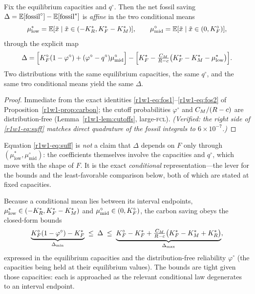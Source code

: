 \begin{theorem}\label{r1w1-thm:suffstat}
Fix the equilibrium capacities and $q^{\circ}$. Then the net fossil saving
$\Delta=\mathbb{E}[\text{fossil}^{\circ}]-\mathbb{E}[\text{fossil}^{*}]$ is \emph{affine} in the
two conditional means
\[
  \mu^{*}_{\mathrm{low}}=\mathbb{E}[\tilde x\mid \tilde x\in(-K_R^{*},K_F^{*}-K_M^{*})],
  \qquad
  \mu^{\circ}_{\mathrm{mid}}=\mathbb{E}[\tilde x\mid \tilde x\in(0,K_F^{\circ})],
\]
through the explicit map
\begin{equation}\label{r1w1-eq:suff}
  \Delta
  =\Big[K_F^{\circ}(1-\varphi^{\circ})+(\varphi^{\circ}-q^{\circ})\mu^{\circ}_{\mathrm{mid}}\Big]
   -\Big[K_F^{*}-\tfrac{C_M}{R-c}\big(K_F^{*}-K_M^{*}-\mu^{*}_{\mathrm{low}}\big)\Big].
\end{equation}
Two distributions with the same equilibrium capacities, the same $q^{\circ}$, and
the same two conditional means yield the same $\Delta$.
\end{theorem}

\begin{proof}
Immediate from the exact identities \eqref{r1w1-eq:fos1}--\eqref{r1w1-eq:fos2} of
Proposition~\ref{r1w1-prop:carbon}; the cutoff probabilities $\varphi^{\circ}$ and
$C_M/(R-c)$ are distribution-free (Lemma~\ref{r1w1-lem:cutoffs}, large-\textsc{fcl}).
\emph{(Verified: the right side of \eqref{r1w1-eq:suff} matches direct quadrature of the
fossil integrals to $6\times10^{-7}$.)}
\end{proof}

\begin{remark}
Equation \eqref{r1w1-eq:suff} is \emph{not} a claim that $\Delta$ depends on $F$ only
through $(\mu^{*}_{\mathrm{low}},\mu^{\circ}_{\mathrm{mid}})$: the coefficients
themselves involve the capacities and $q^{\circ}$, which move with the shape of
$F$. It is the exact \emph{conditional} representation---the lever for the bounds
and the least-favorable comparison below, both of which are stated at fixed
capacities.
\end{remark}

\begin{theorem}\label{r1w1-thm:bounds}
Because a conditional mean lies between its interval endpoints,
$\mu^{*}_{\mathrm{low}}\in(-K_R^{*},K_F^{*}-K_M^{*})$ and $\mu^{\circ}_{\mathrm{mid}}\in(0,K_F^{\circ})$,
the carbon saving obeys the closed-form bounds
\begin{equation}\label{r1w1-eq:bounds}
  \underbrace{K_F^{\circ}(1-\varphi^{\circ})-K_F^{*}}_{\Delta_{\min}}
  \;\le\;\Delta\;\le\;
  \underbrace{K_F^{\circ}-K_F^{*}+\tfrac{C_M}{R-c}\big(K_F^{*}-K_M^{*}+K_R^{*}\big)}_{\Delta_{\max}},
\end{equation}
expressed in the equilibrium capacities and the distribution-free reliability
$\varphi^{\circ}$ (the capacities being held at their equilibrium values). The
bounds are tight given those capacities: each is approached as the relevant
conditional law degenerates to an interval endpoint.
\end{theorem}


